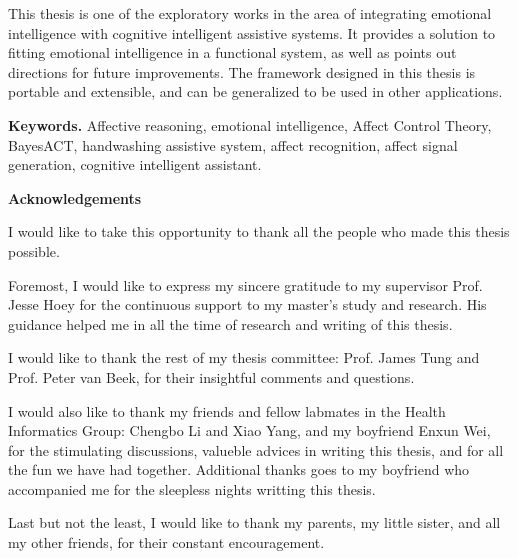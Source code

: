 This thesis is one of the exploratory works in the area of integrating emotional intelligence with cognitive intelligent assistive systems. It provides a solution to fitting emotional intelligence in a functional system, as well as points out directions for future improvements. The framework designed in this thesis is portable and extensible, and can be generalized to be used in other applications.

\vskip 1cm
\noindent\textbf{Keywords.} Affective reasoning, emotional intelligence, Affect Control Theory, BayesACT, handwashing assistive system, affect recognition, affect signal generation, cognitive intelligent assistant.

\cleardoublepage


\begin{center}\textbf{Acknowledgements}\end{center}

I would like to take this opportunity to thank all the people who made this thesis possible.

Foremost, I would like to express my sincere gratitude to my supervisor Prof. Jesse Hoey for the continuous support to my master's study and research. His guidance helped me in all the time of research and writing of this thesis. 

I would like to thank the rest of my thesis committee: Prof. James Tung and Prof. Peter van Beek, for their insightful comments and questions.

I would also like to thank my friends and fellow labmates in the Health Informatics Group: Chengbo Li and Xiao Yang, and my boyfriend Enxun Wei, for the stimulating discussions, valueble advices in writing this thesis, and for all the fun we have had together. Additional thanks goes to my boyfriend who accompanied me for the sleepless nights writting this thesis.

Last but not the least, I would like to thank my parents, my little sister, and all my other friends, for their constant encouragement.

\cleardoublepage



